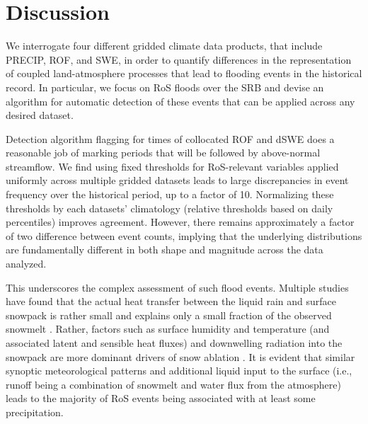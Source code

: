 \documentclass[draft]{agujournal2019}
\begin{document}
\section{Discussion}

We interrogate four different gridded climate data products, that include PRECIP, ROF, and SWE, in order to quantify differences in the representation of coupled land-atmosphere processes that lead to flooding events in the historical record.
In particular, we focus on RoS floods over the SRB and devise an algorithm for automatic detection of these events that can be applied across any desired dataset. 

Detection algorithm flagging for times of collocated ROF and dSWE does a reasonable job of marking periods that will be followed by above-normal streamflow. 
We find using fixed thresholds for RoS-relevant variables applied uniformly across multiple gridded datasets leads to large discrepancies in event frequency over the historical period, up to a factor of 10. 
Normalizing these thresholds by each datasets' climatology (relative thresholds based on daily percentiles) improves agreement. 
However, there remains approximately a factor of two difference between event counts, implying that the underlying distributions are fundamentally different in both shape and magnitude across the data analyzed.


This underscores the complex assessment of such flood events. 
Multiple studies have found that the actual heat transfer between the liquid rain and surface snowpack is rather small and explains only a small fraction of the observed snowmelt \citep{moore1984controls}. 
Rather, factors such as surface humidity and temperature (and associated latent and sensible heat fluxes) and downwelling radiation into the snowpack are more dominant drivers of snow ablation \citep{mazurkiewicz2008assessing,wurzer2016influence,harpold2018humidity}. 
It is evident that similar synoptic meteorological patterns \citep{grote2021synoptic} and additional liquid input to the surface (i.e., runoff being a combination of snowmelt and water flux from the atmosphere) leads to the majority of RoS events being associated with at least some precipitation.
\end{document}
